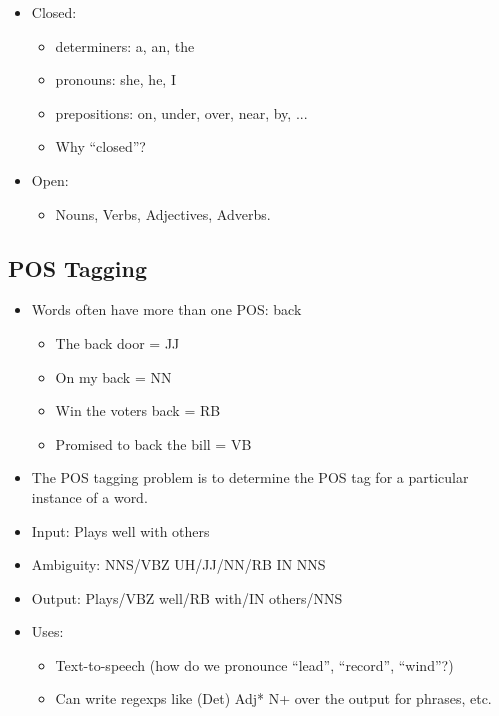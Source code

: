\documentclass[11pt]{article}
\theoremstyle{definition}
\begin{document}
\begin{itemize}
  \item Closed:
  \begin{itemize}
    \item determiners: a, an, the
    \item pronouns: she, he, I
    \item prepositions: on, under, over, near, by, ...
    \item Why “closed”?
  \end{itemize}
  \item Open:
  \begin{itemize}
    \item Nouns, Verbs, Adjectives, Adverbs.
  \end{itemize}
\end{itemize}

\subsection{POS Tagging}
\begin{itemize}
  \item Words often have more than one POS: back
  \begin{itemize}
    \item The back door = JJ
    \item On my back = NN
    \item Win the voters back = RB
    \item Promised to back the bill = VB
  \end{itemize}
  \item The POS tagging problem is to determine the POS tag for a
  particular instance of a word.
\end{itemize}
\begin{itemize}
  \item Input: Plays well with others
  \item Ambiguity: NNS/VBZ UH/JJ/NN/RB IN NNS
  \item Output: Plays/VBZ well/RB with/IN others/NNS
  \item Uses:
  \begin{itemize}
    \item Text-to-speech (how do we pronounce “lead”, “record”, “wind”?)
    \item Can write regexps like (Det) Adj* N+ over the output for phrases, etc.
  \end{itemize}
\end{itemize}
\end{document}
